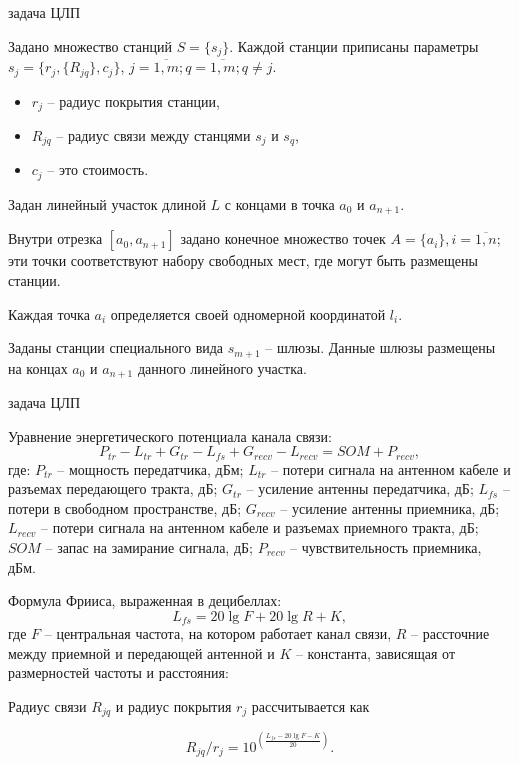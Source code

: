 \begin{frame}
    {задача ЦЛП}
    \justifying

    \bigskip

    Задано множество станций $S = \{s_j\}$. Каждой станции приписаны параметры $s_j = \{r_j, \{R_{jq}\}, c_j \}$, $j = \overline{1,m}; q = \overline{1,m}; q \neq j$. 
    \begin{itemize}
        \item $r_j$ -- радиус покрытия станции,
        \item $R_{jq}$ -- радиус связи между станцями $s_j$ и $s_q$,
        \item $c_j$ -- это стоимость.
    \end{itemize} 
    
    \bigskip

    Задан линейный участок длиной $L$ с концами в точка $a_0$ и $a_{n+1}$. 
    
    Внутри  отрезка $[a_0, a_{n+1}]$ задано конечное множество точек $A=\{a_i\}, i=\overline{1,n}$; эти точки соответствуют набору свободных мест, где могут быть размещены станции.
    
    Каждая точка $a_i$ определяется своей одномерной координатой $l_i$. 
    
    \bigskip
    
    Заданы станции специального вида $s_{m+1}$ -- шлюзы. Данные шлюзы размещены на концах $a_0$ и $a_{n+1}$ данного линейного участка. 
    \bigskip

\end{frame}

\begin{frame}
    {задача ЦЛП}
    \begin{minipage}[t]{1\linewidth}
        \fontsize{8pt}{7.2}\selectfont
        \justifying
        Уравнение энергетического потенциала канала связи:
        $$
        P_{tr} - L_{tr} + G_{tr} - L_{fs} + G_{recv} - L_{recv} = SOM + P_{recv},
        $$
        где: $P_{tr}$ -- мощность передатчика, дБм; $L_{tr}$ -- потери сигнала на антенном кабеле и разъемах передающего тракта, дБ; $G_{tr}$ -- усиление антенны передатчика, дБ; $L_{fs}$ -- потери в свободном пространстве, дБ; $G_{recv}$ -- усиление антенны приемника, дБ; $L_{recv}$ -- потери сигнала на антенном кабеле и разъемах приемного тракта, дБ; $SOM$ -- запас на замирание сигнала, дБ; $P_{recv}$ -- чувствительность приемника, дБм.

        \bigskip
        Формула Фрииса, выраженная в децибеллах:
        $$
        \label{eq:part3_L_fs}
        L_{fs} = 20 \lg{F} + 20\lg{R} + K,
        $$
        где $F$ -- центральная частота, на котором работает канал связи, $R$ -- рассточние между приемной и передающей антенной и $K$ -- константа, зависящая от размерностей частоты и расстояния:
        
        \bigskip
        Радиус связи $R_{jq}$  и радиус покрытия $r_j$ рассчитывается как

        $$
        R_{jq} / r_j = 10^{\left(\frac{L_{fs} - 20\lg{F} - K}{20}\right)}.
        $$
    \end{minipage}

\end{frame}


